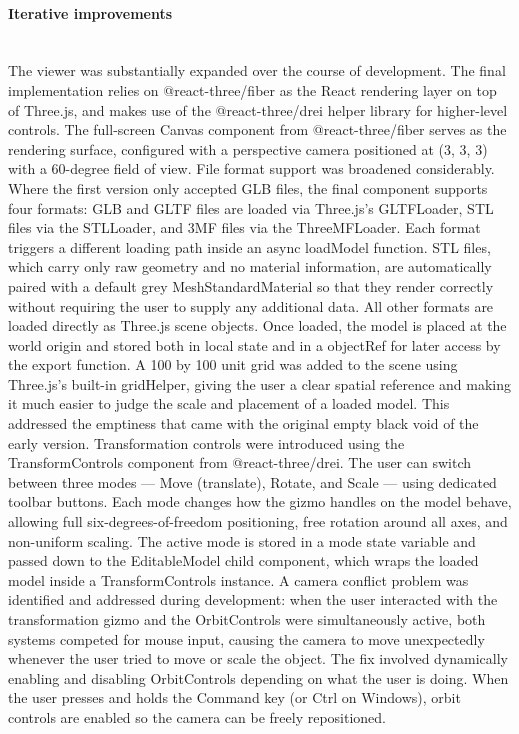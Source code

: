 \documentclass[a4paper,12pt]{article}
\begin{document}
\paragraph{Iterative improvements}\mbox{} \\
The viewer was substantially expanded over the course of development. The final implementation relies on @react-three/fiber\cite{r3f} as the React rendering layer on top of Three.js\cite{threejs}, and makes use of the @react-three/drei\cite{drei} helper library for higher-level controls. The full-screen Canvas component from @react-three/fiber serves as the rendering surface, configured with a perspective camera positioned at (3, 3, 3) with a 60-degree field of view.
File format support was broadened considerably. Where the first version only accepted GLB files, the final component supports four formats: GLB and GLTF files are loaded via Three.js's GLTFLoader\cite{threejs}, STL files via the STLLoader, and 3MF files via the ThreeMFLoader. Each format triggers a different loading path inside an async loadModel function. STL files, which carry only raw geometry and no material information, are automatically paired with a default grey MeshStandardMaterial so that they render correctly without requiring the user to supply any additional data. All other formats are loaded directly as Three.js scene objects. Once loaded, the model is placed at the world origin and stored both in local state and in a objectRef for later access by the export function.
A 100 by 100 unit grid was added to the scene using Three.js's built-in gridHelper, giving the user a clear spatial reference and making it much easier to judge the scale and placement of a loaded model. This addressed the emptiness that came with the original empty black void of the early version.
Transformation controls were introduced using the TransformControls component from @react-three/drei. The user can switch between three modes — Move (translate), Rotate, and Scale — using dedicated toolbar buttons. Each mode changes how the gizmo handles on the model behave, allowing full six-degrees-of-freedom positioning, free rotation around all axes, and non-uniform scaling. The active mode is stored in a mode state variable and passed down to the EditableModel child component, which wraps the loaded model inside a TransformControls instance.
A camera conflict problem was identified and addressed during development: when the user interacted with the transformation gizmo and the OrbitControls were simultaneously active, both systems competed for mouse input, causing the camera to move unexpectedly whenever the user tried to move or scale the object. The fix involved dynamically enabling and disabling OrbitControls depending on what the user is doing. When the user presses and holds the Command key (or Ctrl on Windows), orbit controls are enabled so the camera can be freely repositioned. 
\end{document}
